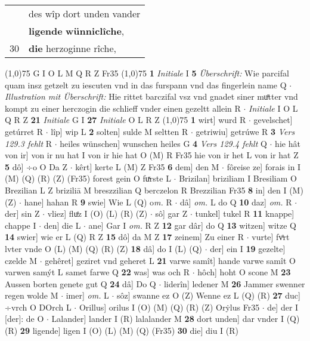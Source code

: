 \documentclass[8pt,a4paper,notitlepage]{article}
\begin{document}
\begin{table}[ht]
\begin{minipage}[t]{0.5\linewidth}
\begin{tabular}{rl}
 & des wîp dort unden vander\\ 
 & \textbf{ligende} \textbf{wünniclîche},\\ 
30 & \textbf{die} herzoginne rîche,\\ 
\end{tabular}
\scriptsize
\line(1,0){75} \newline
G I O L M Q R Z Fr35 \newline
\line(1,0){75} \newline
\textbf{1} \textit{Initiale} I  \textbf{5} \textit{Überschrift:} Wie parcifal quam insz getzelt zu iescuten vnd in das furspann vnd das fingerlein name Q   $\cdot$ \textit{Illustration mit Überschrift:} Hie rittet barczifal vsz vnd gnadet siner muͦtter vnd kompt zu einer herczogin die schlieff vnder einen gezeltt allein R   $\cdot$ \textit{Initiale} I O L Q R Z  \textbf{21} \textit{Initiale} G I  \textbf{27} \textit{Initiale} O L R Z  \newline
\line(1,0){75} \newline
\textbf{1} wirt] wurd R  $\cdot$ gevelschet] getúrret R  $\cdot$ lîp] wip L \textbf{2} solten] sulde M seltten R  $\cdot$ getriwiu] getrúwe R \textbf{3} \textit{Vers 129.3 fehlt} R   $\cdot$ heiles wünschen] wunschen heiles G \textbf{4} \textit{Vers 129.4 fehlt} Q   $\cdot$ hie hât von ir] von ir nu hat I von ir hie hat O (M) R Fr35 hie von ir het L von ir hat Z \textbf{5} dô] ÷o O Da Z  $\cdot$ kêrt] kerte L (M) Z Fr35 \textbf{6} dem] den M  $\cdot$ fôreise ze] forais in I (M) (Q) (R) (Z) (Fr35) forest gein O fuͯrste L  $\cdot$ Brizilan] briziliam I Bresiliam O Brezilian L Z briziliā M breszzilian Q berczelon R Brezzilian Fr35 \textbf{8} in] den I (M) (Z)  $\cdot$ hane] hahan R \textbf{9} swie] Wie L (Q) o\textit{m. } R  $\cdot$ dâ] \textit{om.} L do Q \textbf{10} daz] \textit{om.} R  $\cdot$ der] sin Z  $\cdot$ vliez] fluͤz I (O) (L) (R) (Z)  $\cdot$ sô] gar Z  $\cdot$ tunkel] tukel R \textbf{11} knappe] chappe I  $\cdot$ den] die L  $\cdot$ ane] Gar I \textit{om.} R Z \textbf{12} gar dâr] do Q \textbf{13} witzen] witze Q \textbf{14} swier] wie er L (Q) R Z \textbf{15} dô] da M Z \textbf{17} zeinem] Zu einer R  $\cdot$ vurte] fvͦrt lvter vnde O (L) (M) (Q) (R) (Z) \textbf{18} dâ] do I (L) (Q)  $\cdot$ der] ein I \textbf{19} gezelte] czelde M  $\cdot$ gehêret] geziret vnd geheret L \textbf{21} varwe samît] hande varwe samît O varwen samýt L samet farwe Q \textbf{22} was] was och R  $\cdot$ hôch] hoht O scone M \textbf{23} Aussen borten genete gut Q \textbf{24} dâ] Do Q  $\cdot$ liderîn] ledener M \textbf{26} Jammer swenner regen wolde M  $\cdot$ imer] \textit{om.} L  $\cdot$ sôz] swanne ez O (Z) Wenne ez L (Q) (R) \textbf{27} duc] ÷vrch O DOrch L  $\cdot$ Orillus] orilus I (O) (M) (Q) (R) (Z) Orẏlus Fr35  $\cdot$ de] der I [der]: de O  $\cdot$ Lalander] lander I (R) lalalander M \textbf{28} dort unden] dar vnder I (Q) (R) \textbf{29} ligende] ligen I (O) (L) (M) (Q) (Fr35) \textbf{30} die] diu I (R) \newline

\end{minipage}
\end{table}
\end{document}
